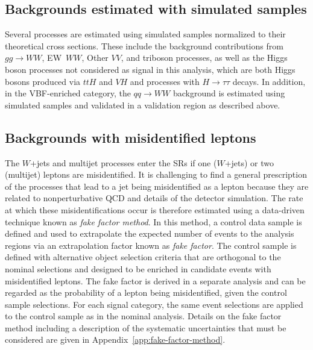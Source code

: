 \subsection{Backgrounds estimated with simulated samples}
Several processes are estimated using simulated samples normalized to their theoretical cross sections.
These include the background contributions from $gg \to WW$, EW~$WW$, Other $VV$, and triboson processes, as well as the Higgs boson processes not considered as signal in this analysis, which are both Higgs bosons produced via $ttH$ and $VH$ and processes with $H\to\tau\tau$ decays. In addition, in the VBF-enriched \TwoJet category, the $qq \to WW$ background is estimated using simulated samples and validated in a validation region as described above.

\subsection{Backgrounds with misidentified leptons}
\label{subsec:misid-bkg}
The $W$+jets and multijet processes enter the SRs if one ($W$+jets) or two (multijet) leptons are misidentified.
It is challenging to find a general prescription of the processes that lead to a jet being misidentified as a lepton because they are related to nonperturbative QCD and details of the detector simulation. 
The rate at which these misidentifications occur is therefore estimated using a data-driven technique known as \emph{fake factor method}. In this method, a control data sample is defined and used to extrapolate the expected number of events to the analysis regions via an extrapolation factor known as \emph{fake factor}.
The control sample is defined with alternative object selection criteria that are orthogonal to the nominal selections and designed to be enriched in candidate events with misidentified leptons.
The fake factor is derived in a separate analysis and can be regarded as the probability of a lepton being misidentified, given the control sample selections.
For each signal category, the same event selections are applied to the control sample as in the nominal analysis. Details on the fake factor method including a description of the systematic uncertainties that must be considered are given in Appendix~\ref{app:fake-factor-method}.

